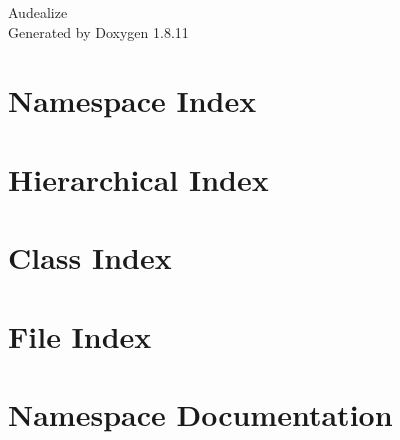 \documentclass[twoside]{book}
\newcommand{\+}{\discretionary{\mbox{\scriptsize$\hookleftarrow$}}{}{}}
\newcommand{\clearemptydoublepage}{%
  \newpage{\pagestyle{empty}\cleardoublepage}%
}
\begin{document}
\hypersetup{pageanchor=false,
             bookmarksnumbered=true,
             pdfencoding=unicode
            }
\begin{titlepage}
\vspace*{7cm}
\begin{center}%
{\Large Audealize }\\
\vspace*{1cm}
{\large Generated by Doxygen 1.8.11}\\
\end{center}
\end{titlepage}
\clearemptydoublepage
\tableofcontents
\clearemptydoublepage
{}
\hypersetup{pageanchor=true}

\chapter{Namespace Index}

\chapter{Hierarchical Index}

\chapter{Class Index}

\chapter{File Index}

\chapter{Namespace Documentation}





\end{document}
